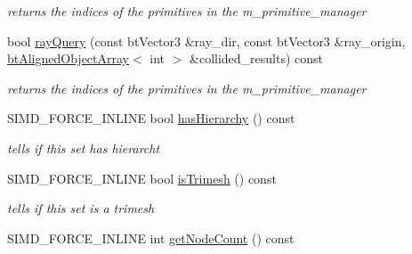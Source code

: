 \begin{CompactItemize}
\begin{CompactList}\small\item\em returns the indices of the primitives in the m\_\-primitive\_\-manager \item\end{CompactList}\item 
\hypertarget{classbt_g_impact_quantized_bvh_284ae5b0d5e813bb0bcc02d76cff8b1b}{
bool \hyperlink{classbt_g_impact_quantized_bvh_284ae5b0d5e813bb0bcc02d76cff8b1b}{rayQuery} (const btVector3 \&ray\_\-dir, const btVector3 \&ray\_\-origin, \hyperlink{classbt_aligned_object_array}{btAlignedObjectArray}$<$ int $>$ \&collided\_\-results) const }
\label{classbt_g_impact_quantized_bvh_284ae5b0d5e813bb0bcc02d76cff8b1b}

\begin{CompactList}\small\item\em returns the indices of the primitives in the m\_\-primitive\_\-manager \item\end{CompactList}\item 
\hypertarget{classbt_g_impact_quantized_bvh_6abb937a9e61b3f1c2c4a74ac21f6441}{
SIMD\_\-FORCE\_\-INLINE bool \hyperlink{classbt_g_impact_quantized_bvh_6abb937a9e61b3f1c2c4a74ac21f6441}{hasHierarchy} () const }
\label{classbt_g_impact_quantized_bvh_6abb937a9e61b3f1c2c4a74ac21f6441}

\begin{CompactList}\small\item\em tells if this set has hierarcht \item\end{CompactList}\item 
\hypertarget{classbt_g_impact_quantized_bvh_248ff485a71d70ccdaf1a910026cfed1}{
SIMD\_\-FORCE\_\-INLINE bool \hyperlink{classbt_g_impact_quantized_bvh_248ff485a71d70ccdaf1a910026cfed1}{isTrimesh} () const }
\label{classbt_g_impact_quantized_bvh_248ff485a71d70ccdaf1a910026cfed1}

\begin{CompactList}\small\item\em tells if this set is a trimesh \item\end{CompactList}\item 
\hypertarget{classbt_g_impact_quantized_bvh_5ffe3a11330ab3bce0d6eaffb9b3f689}{
SIMD\_\-FORCE\_\-INLINE int \hyperlink{classbt_g_impact_quantized_bvh_5ffe3a11330ab3bce0d6eaffb9b3f689}{getNodeCount} () const }
\label{classbt_g_impact_quantized_bvh_5ffe3a11330ab3bce0d6eaffb9b3f689}


\end{CompactItemize}
